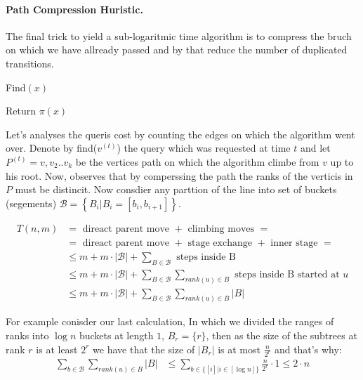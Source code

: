 \paragraph{Path Compression Huristic.} The final trick to yield a sub-logaritmic time algorithm is to compress the bruch on which we have allready passed and by that reduce the number of duplicated transitions.     
\begin{algbox}{Find$(x)$}
  \begin{algorithm}[H]
    Return $\pi\left(x\right)$ 
  \end{algorithm}    
\end{algbox}
Let's analyses the queris cost by counting the edges on which the algorithm went over. Denote by find($v^{(t)}$) the query which was requested at time $t$ and let $P^{(t)}=v,v_{2} .. v_{k}$ be the vertices path on which the algorithm climbe from $v$ up to his root. Now, observes that by comperssing the path the ranks of the verticis in $P$ must be distincit. Now consdier any parttion of the line into set of buckets (segements) $\mathcal{B}= \left\{ B_{i} | B_{i} = [b_{i} ,b_{i+1}] \right\}$. 


\begin{equation*}
  \begin{split}
    T\left( n, m  \right) &= \text{ direact parent move } + \text{ climbing moves  } =    \\
    &=  \text{ direact parent move } + \text{ stage exchange } +  \text{ inner stage } = \\ 
    & \le m + m \cdot | \mathcal{B} | + \sum_{ B \in \mathcal{B} }{ \text{ steps inside B  }   }\\
    & \le m + m \cdot | \mathcal{B} | + \sum_{ B \in \mathcal{B} }{ \sum_{ rank(u) \in B} { \text{ steps inside B started at }u }  }\\
    & \le m + m \cdot | \mathcal{B} | + \sum_{ B \in \mathcal{B} }{ \sum_{ rank(u) \in B}{ |B| }  } %
  \end{split}
\end{equation*}

For example conisder our last calculation, In which we divided the ranges of ranks into $\log n$ buckets at length $1$, $B_{r} = \{r\}$, then as the size of the subtrees at rank $r$ is at least $2^{r}$ we have that the size of $|B_{r}|$ is at most $\frac{n}{2^{r}}$ and that's why:   
\begin{equation*}
  \begin{split}
    \sum_{ b \in \mathcal{B} }{ \sum_{ rank(u) \in B}{ |B| } } &\le \sum_{ b \in \{ [i] | i \in [ \log n ]  \}  }{ \frac{n}{2^{r}} \cdot 1    } \le  2\cdot n
  \end{split}
\end{equation*}

